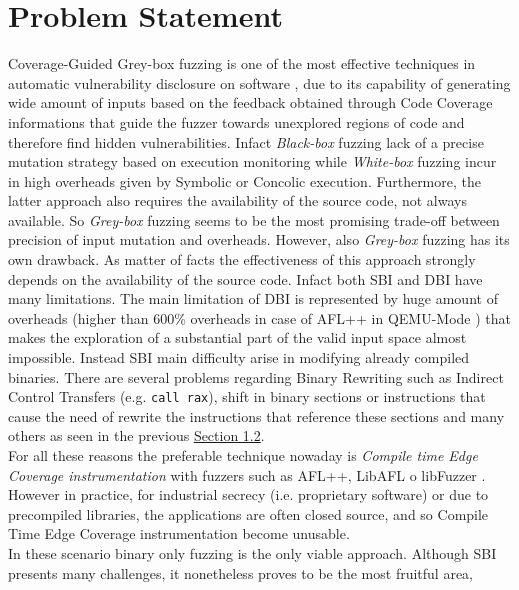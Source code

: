 \section{Problem Statement}\label{sec:problem_statement}
    Coverage-Guided Grey-box fuzzing is one of the most effective techniques in automatic vulnerability disclosure on software 
    \cite{zafl,Boehme2016}, 
    due to its capability of generating wide amount of inputs based on the feedback obtained through Code Coverage informations 
    that guide the fuzzer towards unexplored regions of code and therefore find hidden vulnerabilities.
    Infact \textit{Black-box} fuzzing lack of a precise mutation strategy based on execution monitoring while 
    \textit{White-box} fuzzing incur in high overheads given by Symbolic or Concolic execution.
    Furthermore, the latter approach also requires the availability of the source code, not always available.
    So \textit{Grey-box} fuzzing seems to be the most promising trade-off between precision of input mutation and overheads.
    However, also \textit{Grey-box} fuzzing has its own drawback.
    As matter of facts the effectiveness of this approach strongly depends on the availability of the source code.
    Infact both \gls{SBI} and \gls{DBI} have many limitations.
    The main limitation of \gls{DBI} is represented by huge amount of overheads (higher than 600\% overheads 
    in case of AFL++ in QEMU-Mode \cite{zafl}) that makes the exploration of a substantial part 
    of the valid input space almost impossible.
    Instead \gls{SBI} main difficulty arise in modifying already compiled binaries.
    There are several problems regarding Binary Rewriting such as Indirect Control Transfers (e.g. \texttt{call rax}), 
    shift in binary sections or instructions that cause the need of rewrite the instructions that reference these sections and many others 
    as seen in the previous \hyperref[sec:biniary_rewriting]{Section 1.2}.\\
    For all these reasons the preferable technique nowaday is \textit{Compile time Edge Coverage instrumentation} with fuzzers such as 
    AFL++, LibAFL \cite{libafl} o libFuzzer \cite{libfuzzer}.
    However in practice, for industrial secrecy (i.e. proprietary software) or due to precompiled libraries, the applications are 
    often closed source, and so Compile Time Edge Coverage instrumentation become unusable.\\
    In these scenario binary only fuzzing is the only viable approach.
    Although \gls{SBI} presents many challenges, it nonetheless proves to be the most fruitful area, 

